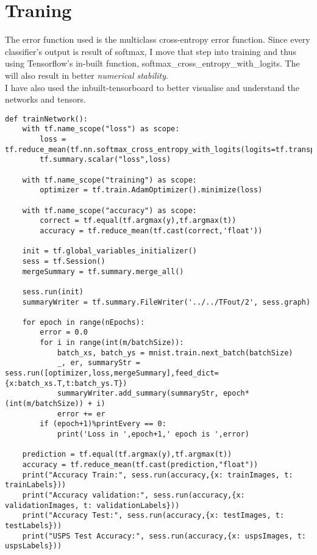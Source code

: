 \documentclass[a4paper,11pt]{article}
\begin{document}
\section*{Traning}

The error function used is the multiclass cross-entropy error function.
Since every classifier's output is result of softmax, I move that step into training and thus using Tensorflow's in-built function, softmax\_cross\_entropy\_with\_logits. The will also result in better \textit{numerical stability}.\\
I have also used the inbuilt-tensorboard to better visualise and understand the networks and tensors.

\begin{lstlisting}[label={list:fourth}]
def trainNetwork():
	with tf.name_scope("loss") as scope:
		loss = tf.reduce_mean(tf.nn.softmax_cross_entropy_with_logits(logits=tf.transpose(y),labels=tf.transpose(t)))
		tf.summary.scalar("loss",loss)
	
	with tf.name_scope("training") as scope:
		optimizer = tf.train.AdamOptimizer().minimize(loss)
	
	with tf.name_scope("accuracy") as scope:
		correct = tf.equal(tf.argmax(y),tf.argmax(t))
		accuracy = tf.reduce_mean(tf.cast(correct,'float'))
	
	init = tf.global_variables_initializer()
	sess = tf.Session()
	mergeSummary = tf.summary.merge_all()
	
	sess.run(init)
	summaryWriter = tf.summary.FileWriter('../../TFout/2', sess.graph)
	
	for epoch in range(nEpochs):
		error = 0.0
		for i in range(int(m/batchSize)):
			batch_xs, batch_ys = mnist.train.next_batch(batchSize)
			_, er, summaryStr = sess.run([optimizer,loss,mergeSummary],feed_dict={x:batch_xs.T,t:batch_ys.T})
			summaryWriter.add_summary(summaryStr, epoch*(int(m/batchSize)) + i)
			error += er
		if (epoch+1)%printEvery == 0:
			print('Loss in ',epoch+1,' epoch is ',error)
	
	prediction = tf.equal(tf.argmax(y),tf.argmax(t))
	accuracy = tf.reduce_mean(tf.cast(prediction,"float"))
	print("Accuracy Train:", sess.run(accuracy,{x: trainImages, t: trainLabels}))
	print("Accuracy validation:", sess.run(accuracy,{x: validationImages, t: validationLabels}))
	print("Accuracy Test:", sess.run(accuracy,{x: testImages, t: testLabels}))
	print("USPS Test Accuracy:", sess.run(accuracy,{x: uspsImages, t: uspsLabels}))
\end{lstlisting}
\end{document}
